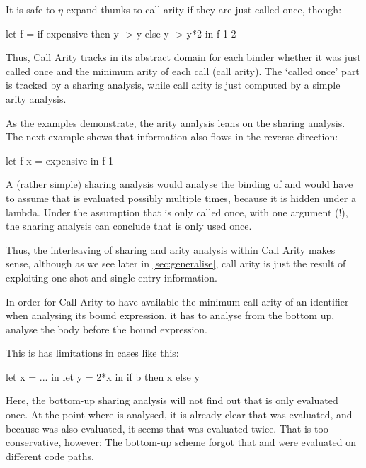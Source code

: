 It is safe to $\eta$-expand thunks to call arity if they are just called once, though:
\begin{haskellcode}
  let f =
        if expensive
        then \x y -> y
        else \x y -> y*2
  in f 1 2
\end{haskellcode}

Thus, Call Arity tracks in its abstract domain for each binder whether it was just called once and the minimum arity of each call (call arity).
The `called once' part is tracked by a sharing analysis, while call arity is just computed by a simple arity analysis.

As the examples demonstrate, the arity analysis leans on the sharing analysis.
The next example shows that information also flows in the reverse direction:
\begin{haskellcode}
  let f x = expensive
  in f 1
\end{haskellcode}

A (rather simple) sharing analysis would analyse the binding of  and would have to assume that  is evaluated possibly multiple times, because it is hidden under a lambda.
Under the assumption that  is only called once, with one argument (!), the sharing analysis can conclude that  is only used once.

Thus, the interleaving of sharing and arity analysis within Call Arity makes sense, although as we see later in \cref{sec:generalise}, call arity is just the result of exploiting one-shot and single-entry information.\smallskip

In order for Call Arity to have available the minimum call arity of an identifier when analysing its bound expression, it has to analyse  from the bottom up, \eg analyse the body before the bound expression.

This is has limitations in cases like this:
\begin{haskellcode}
  let x = ...
  in let y = 2*x
     in if b
        then x
        else y
\end{haskellcode}

Here, the bottom-up sharing analysis will not find out that  is only evaluated once. 
At the point where  is analysed, it is already clear that  was evaluated, and because  was also evaluated, it seems that  was evaluated twice.
That is too conservative, however: The bottom-up scheme forgot that  and  were evaluated on different code paths.

